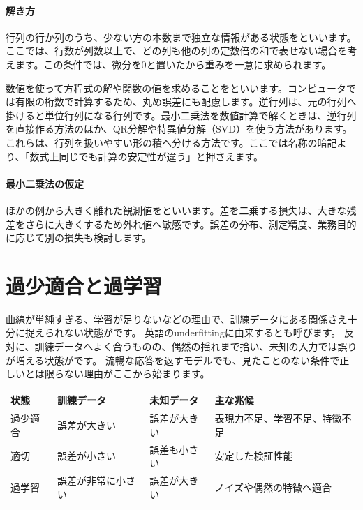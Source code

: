 \par
\endgroup
\medskip
\begingroup
\paragraph{解き方}
        行列の行か列のうち、少ない方の本数まで独立な情報がある状態をといいます。ここでは、行数が列数以上で、どの列も他の列の定数倍の和で表せない場合を考えます。この条件では、微分を0と置いたから重みを一意に求められます。

        数値を使って方程式の解や関数の値を求めることをといいます。コンピュータでは有限の桁数で計算するため、丸め誤差にも配慮します。逆行列は、元の行列へ掛けると単位行列になる行列です。最小二乗法を数値計算で解くときは、逆行列を直接作る方法のほか、QR分解や特異値分解（SVD）を使う方法があります。これらは、行列を扱いやすい形の積へ分ける方法です。ここでは名称の暗記より、「数式上同じでも計算の安定性が違う」と押さえます。

\paragraph{最小二乗法の仮定}
        ほかの例から大きく離れた観測値をといいます。差を二乗する損失は、大きな残差をさらに大きくするため外れ値へ敏感です。誤差の分布、測定精度、業務目的に応じて別の損失も検討します。

\par
\endgroup
\par
\endgroup


\section{過少適合と過学習}
\label{sec:06-machine-learning-10}

曲線が単純すぎる、学習が足りないなどの理由で、訓練データにある関係さえ十分に捉えられない状態がです。
英語のunderfittingに由来するとも呼びます。
反対に、訓練データへよく合うものの、偶然の揺れまで拾い、未知の入力では誤りが増える状態がです。
流暢な応答を返すモデルでも、見たことのない条件で正しいとは限らない理由がここから始まります。

\begingroup
  \noindent
  \begin{tabularx}{\textwidth}{@{}lYYY@{}}
    \toprule
    状態 & 訓練データ & 未知データ & 主な兆候\\
    \midrule
    過少適合 & 誤差が大きい & 誤差が大きい & 表現力不足、学習不足、特徴不足\\
    適切 & 誤差が小さい & 誤差も小さい & 安定した検証性能\\
    過学習 & 誤差が非常に小さい & 誤差が大きい & ノイズや偶然の特徴へ適合\\
    \bottomrule
  \end{tabularx}
  \vspace{4mm}
\begingroup
